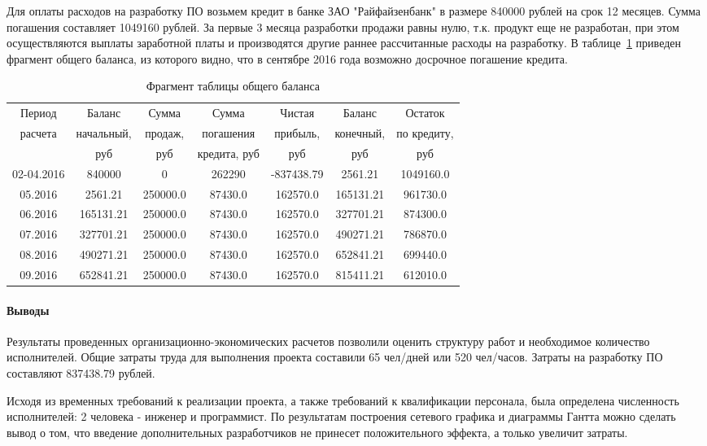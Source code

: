 Для оплаты расходов на разработку ПО возьмем кредит в банке ЗАО "Райфайзенбанк" в размере 840000 рублей на срок 12 месяцев. Сумма погашения составляет 1049160 рублей. За первые 3 месяца разработки продажи равны нулю, т.к. продукт еще не разработан, при этом осуществляются выплаты заработной платы и производятся другие раннее рассчитанные расходы на разработку. В таблице~\ref{table:money_balance} приведен фрагмент общего баланса, из которого видно, что в сентябре 2016 года возможно досрочное погашение кредита.
\begin{table}
\caption{Фрагмент таблицы общего баланса}
\label{table:money_balance}
\begin{tabular} {| c | c | c | c | c | c | c |} 
\hline
Период & Баланс & Сумма & Сумма & Чистая & Баланс & Остаток\\
расчета & начальный, & продаж, & погашения & прибыль, & конечный, & по кредиту,\\
& руб & руб & кредита, руб & руб & руб & руб\\
\hline
02-04.2016 & 840000 & 0 & 262290 & -837438.79 & 2561.21 & 1049160.0\\
\hline
05.2016 & 2561.21 & 250000.0 & 87430.0 & 162570.0 & 165131.21 & 961730.0\\
\hline
06.2016 & 165131.21 & 250000.0 & 87430.0 & 162570.0 & 327701.21 & 874300.0\\
\hline
07.2016 & 327701.21 & 250000.0 & 87430.0 & 162570.0 & 490271.21 & 786870.0\\
\hline
08.2016 & 490271.21 & 250000.0 & 87430.0 & 162570.0 & 652841.21 & 699440.0\\
\hline
09.2016 & 652841.21 & 250000.0 & 87430.0 & 162570.0 & 815411.21 & 612010.0\\
\hline
\end{tabular}
\end{table}


\paragraph{Выводы}

Результаты проведенных организационно-экономических расчетов позволили оценить структуру работ и необходимое количество исполнителей. Общие затраты труда для выполнения проекта составили 65 чел/дней или 520 чел/часов. Затраты на разработку ПО составляют 837438.79 рублей.

Исходя из временных требований к реализации проекта, а также требований к квалификации персонала, была определена численность исполнителей: 2 человека - инженер и программист. По результатам построения сетевого графика и диаграммы Гантта можно сделать вывод о том, что введение дополнительных разработчиков не принесет положительного эффекта, а только увеличит затраты.

